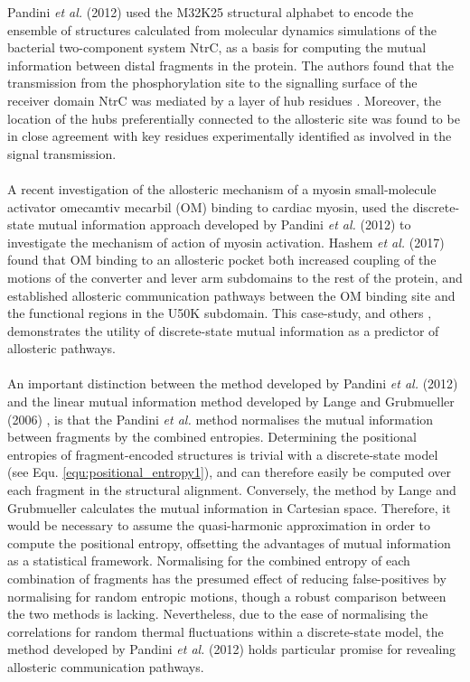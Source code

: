 %
%
%
\clearpage
Pandini \textit{et al.} (2012) \cite{Pandini:2012aa} used the M32K25 structural alphabet to encode the ensemble of structures calculated from molecular dynamics simulations of the bacterial two-component system NtrC, as a basis for computing the mutual information between distal fragments in the protein. The authors found that the transmission from the phosphorylation site to the signalling surface of the receiver domain NtrC was mediated by a layer of hub residues \cite{Pandini:2012aa}. Moreover, the location of the hubs preferentially connected to the allosteric site was found to be in close agreement with key residues experimentally identified as involved in the signal transmission.
%
%
\\\\
%
%
A recent investigation of the allosteric mechanism of a myosin small-molecule activator omecamtiv mecarbil (OM) binding to cardiac myosin, used the discrete-state mutual information approach developed by Pandini \textit{et al.} (2012) \cite{Pandini:2012aa} to investigate the mechanism of action of myosin activation. Hashem \textit{et al.} (2017) \cite{Hashem:2017aa} found that OM binding to an allosteric pocket both increased coupling of the motions of the converter and lever arm subdomains to the rest of the protein, and established allosteric communication pathways between the OM binding site and the functional regions in the U50K subdomain. This case-study, and others \cite{Fornili:2013aa,Motta:2018aa,Pandini:2012aa,Pandini:2013aa,Pandini:2015aa,Pandini:2016aa}, demonstrates the utility of discrete-state mutual information as a predictor of allosteric pathways. 
%
%
\\\\
%
%
An important distinction between the method developed by Pandini \textit{et al.} (2012) \cite{Pandini:2012aa} and the linear mutual information method developed by Lange and Grubmueller (2006) \cite{Lange:2006aa}, is that the Pandini \textit{et al.} method normalises the mutual information between fragments by the combined entropies. Determining the positional entropies of fragment-encoded structures is trivial with a discrete-state model (see Equ. \ref{equ:positional_entropy1}), and can therefore easily be computed over each fragment in the structural alignment. Conversely, the method by Lange and Grubmueller calculates the mutual information in Cartesian space. Therefore, it would be necessary to assume the quasi-harmonic approximation in order to compute the positional entropy, offsetting the advantages of mutual information as a statistical framework. Normalising for the combined entropy of each combination of fragments has the presumed effect of reducing false-positives by normalising for random entropic motions, though a robust comparison between the two methods is lacking. Nevertheless, due to the ease of normalising the correlations for random thermal fluctuations within a discrete-state model, the method developed by Pandini \textit{et al.} (2012) \cite{Pandini:2012aa} holds particular promise for revealing allosteric communication pathways. 
